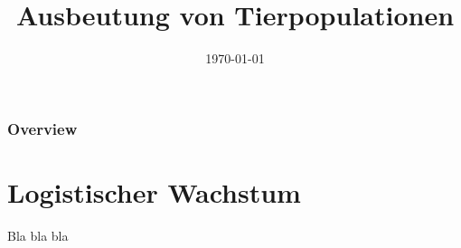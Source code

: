 \documentclass[]{beamer}
\title{Ausbeutung von Tierpopulationen}
\date{\today}
\begin{document}
	
	\maketitle
	
	\begin{frame}
		\frametitle{Overview} 
		\tableofcontents
	\end{frame}

	\section{Logistischer Wachstum}
	\begin{frame}
		Bla bla bla
	\end{frame}	
		
\end{document}
